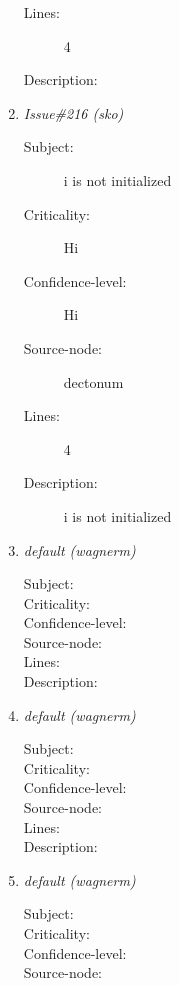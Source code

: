 \begin{enumerate}
\begin{description}
\item [Lines:] 4

\item [Description:] 
\end{description}
\item {\it Issue\#216 (sko)}
\begin{description}
\item [Subject:] i is not initialized
\item [Criticality:] Hi
\item [Confidence-level:] Hi
\item [Source-node:] dectonum

\item [Lines:] 4

\item [Description:] i is not initialized
\end{description}
\item {\it default (wagnerm)}
\begin{description}
\item [Subject:] 
\item [Criticality:] 
\item [Confidence-level:] 
\item [Source-node:] 

\item [Lines:] 

\item [Description:] 
\end{description}
\item {\it default (wagnerm)}
\begin{description}
\item [Subject:] 
\item [Criticality:] 
\item [Confidence-level:] 
\item [Source-node:] 

\item [Lines:] 

\item [Description:] 
\end{description}
\item {\it default (wagnerm)}
\begin{description}
\item [Subject:] 
\item [Criticality:] 
\item [Confidence-level:] 
\item [Source-node:] 


\end{description}
\end{enumerate}
